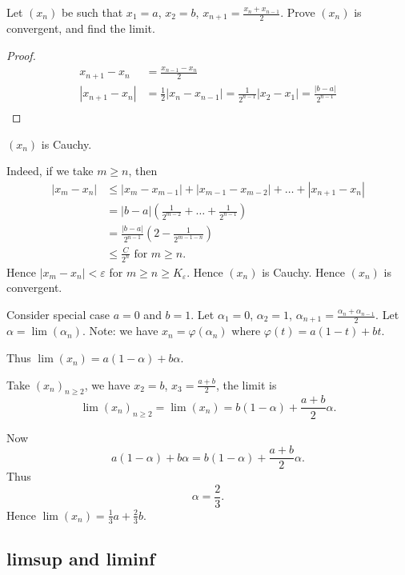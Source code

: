
\begin{example}
	Let $(x_n)$ be such that $x_1 = a$, $x_2 = b$, $x_{n+1} = \frac{x_n + x_{n-1}}{2}$. Prove $(x_n) $ is convergent, and find the limit.

	\begin{proof}
		\begin{align*}
			x_{n+1} - x_n &= \frac{x_{n-1} - x_n}{2}\\
		|x_{n+1} - x_n| &= \frac{1}{2} |x_n - x_{n-1}| = \frac{1}{2^{n-1}}|x_2 - x_1| = \frac{|b-a|}{2^{n-1}} \\
		\end{align*}
	\end{proof}
	\begin{claim}
		$(x_n)$ is Cauchy.
	\end{claim}
	Indeed, if we take $m\ge n$, then 
	\begin{align*}
		|x_m - x_n| &\le |x_m - x_{m-1}| + |x_{m-1}-x_{m-2}| + \ldots + |x_{n+1} - x_n| \\
		&= |b-a| \left( \frac{1}{2^{m-2}}+ \ldots + \frac{1}{2^{n-1}} \right) \\
		&=\frac{|b-a|}{2^{n-1}} \left(2 - \frac{1}{2^{m-1-n}}\right)\\
		&\le \frac{C}{2^n} \text{ for }m\ge n
	.\end{align*} 
	Hence $|x_m - x_n| < \varepsilon$ for $m \ge n\ge K_\varepsilon$. Hence $(x_n)$ is Cauchy. Hence $(x_n)$ is convergent.

	Consider special case $a = 0$ and  $b = 1$.
	Let $\alpha_1 =0$, $\alpha_2 = 1$, $\alpha_{n+1} = \frac{\alpha_n + \alpha_{n-1}}{2}$. Let $\alpha = \lim (\alpha_n)$. Note: we have $x_n = \varphi(\alpha_n)$ where $\varphi(t) = a(1-t) + bt$. 

	Thus $\lim(x_n) = a (1-\alpha) + b\alpha$.

	Take $(x_n)_{n\ge 2}$, we have $x_2 = b$, $x_3 = \frac{a+b}{2}$, the limit is \[
		\lim(x_n)_{n\ge 2} = \lim(x_n) = b(1-\alpha) + \frac{a+b}{2}\alpha
	.\] 

	Now
	\[
		a(1-\alpha) + b\alpha = b(1-\alpha) + \frac{a+b}{2}\alpha
	.\] 
	Thus \[
		\alpha = \frac{2}{3}
	.\] 
	Hence $\lim (x_n) = \frac{1}{3} a + \frac{2}{3} b$.
\end{example}

\subsection{limsup and  liminf}


